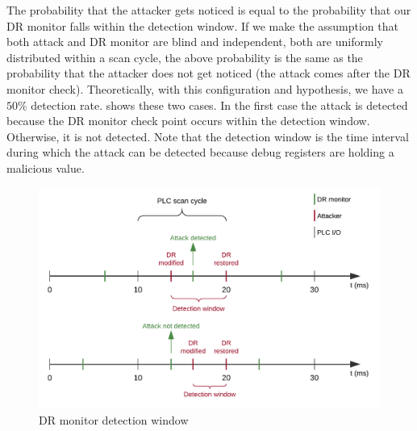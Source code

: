 The probability that the attacker gets noticed is equal to the probability that our DR monitor falls within the detection window.
If we make the assumption that both attack and DR monitor are blind and independent, \ie both are uniformly distributed within a scan cycle,
the above probability is the same as the probability that the attacker does not get noticed (\ie the attack comes after the DR monitor check).
Theoretically, with this configuration and hypothesis, we have a $50\%$ detection rate.  shows these two cases.
In the first case the attack is detected because the DR monitor check point occurs within the detection window. Otherwise, it is not detected.
Note that the detection window is the time interval during which the attack can be detected because debug registers are holding a malicious value.
\begin{figure}[h]
\centerline{\includegraphics[width=\textwidth]{res/dr-window}}
\caption{DR monitor detection window \label{fig:dr-window}}
\end{figure}

